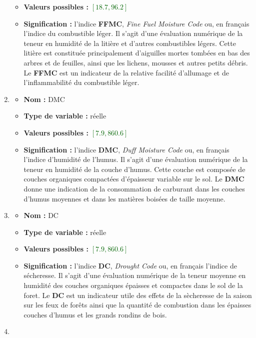 \documentclass{article}
\newcommand{\titre}[1]{\textcolor{title}{#1}}
\newcommand{\gre}[1]{\textcolor{darkgreen}{#1}}
\begin{document}
\begin{sffamily}
\begin{enumerate}
\begin{itemize}
	\item \textbf{Valeurs possibles : }\gre{$[18.7,96.2]$}
	\item \textbf{Signification : }l'indice \textbf{FFMC}, \textit{Fine Fuel Moisture Code} ou, en français l'indice du 
	combustible léger. Il s'agit d'une évaluation numérique de la teneur en humidité de la litière et d'autres combustibles
	légers. Cette litière est constituée principalement d'aiguilles mortes tombées en bas des arbres et de feuilles, ainsi que 
	les lichens, mousses et autres petits débris. Le \textbf{FFMC} est un indicateur de la relative facilité d'allumage et de
	l'inflammabilité du combustible léger.
	\end{itemize}
\item \begin{itemize}
	\item \textbf{Nom : }\titre{DMC}
	\item \textbf{Type de variable : }réelle
	\item \textbf{Valeurs possibles : }\gre{$[7.9,860.6]$}
	\item \textbf{Signification : }l'indice \textbf{DMC}, \textit{Duff Moisture Code} ou, en français l'indice d'humidité de 
	l'humus. Il s'agit d'une évaluation numérique de la teneur en humidité de la couche d'humus. Cette couche est composée de
	couches organiques compactées d'épaisseur variable sur le sol.
	Le \textbf{DMC} donne une indication de la consommation de carburant dans les couches d'humus moyennes et dans les matières 
	boisées de taille moyenne.
\end{itemize}
\item \begin{itemize}
	\item \textbf{Nom : }\titre{DC}
	\item \textbf{Type de variable : }réelle
	\item \textbf{Valeurs possibles : }\gre{$[7.9,860.6]$}
	\item \textbf{Signification : }l'indice \textbf{DC}, \textit{Drought Code} ou, en français l'indice de sécheresse. Il s'agit 
	d'une évaluation numérique de la teneur moyenne en humidité des couches organiques épaisses et compactes dans le sol de la 
	foret. Le \textbf{DC} est un indicateur utile des effets de la sècheresse de la saison sur les feux de forêts ainsi que la
	quantité de combustion dans les épaisses couches d'humus et les grands rondins de bois.
\end{itemize}
\item \begin{itemize}

\end{itemize}
\end{enumerate}
\end{sffamily}
\end{document}
